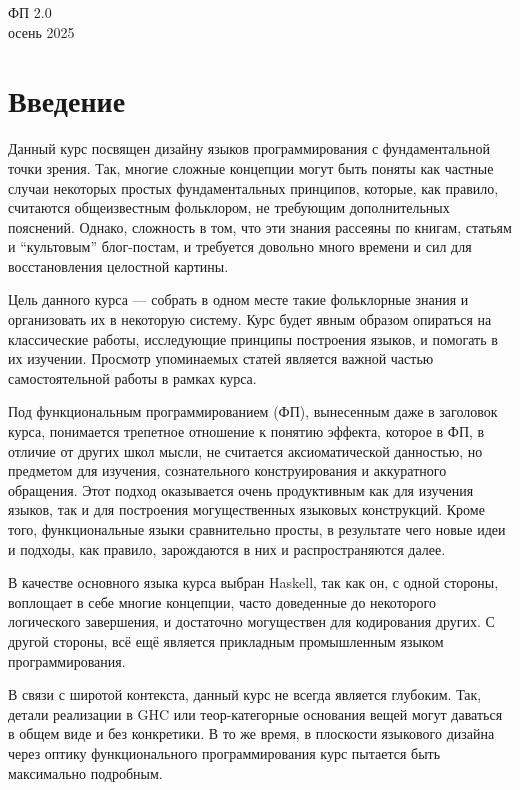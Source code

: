 \documentclass[12pt]{article}
\begin{document}
    \begin{center}
    {\LARGE ФП 2.0}
        \\
        осень 2025
    \end{center}

    \tableofcontents

    \newpage

    \section*{Введение}

    Данный курс посвящен дизайну языков программирования с фундаментальной точки зрения.
    Так, многие сложные концепции могут быть поняты как частные случаи некоторых простых фундаментальных принципов, которые, как правило, считаются общеизвестным фольклором, не требующим дополнительных пояснений.
    Однако, сложность в том, что эти знания рассеяны по книгам, статьям и ``культовым'' блог-постам, и требуется довольно много времени и сил для восстановления целостной картины.

    Цель данного курса --- собрать в одном месте такие фольклорные знания и организовать их в некоторую систему.
    Курс будет явным образом опираться на классические работы, исследующие принципы построения языков, и помогать в их изучении.
    Просмотр упоминаемых статей является важной частью самостоятельной работы в рамках курса.

    Под функциональным программированием (ФП), вынесенным даже в заголовок курса, понимается трепетное отношение к понятию эффекта, которое в ФП, в отличие от других школ мысли, не считается аксиоматической данностью, но предметом для изучения, сознательного конструирования и аккуратного обращения.
    Этот подход оказывается очень продуктивным как для изучения языков, так и для построения могущественных языковых конструкций.
    Кроме того, функциональные языки сравнительно просты, в результате чего новые идеи и подходы, как правило, зарождаются в них и распространяются далее.

    В качестве основного языка курса выбран Haskell, так как он, с одной стороны, воплощает в себе многие концепции, часто доведенные до некоторого логического завершения, и достаточно могуществен для кодирования других.
    С другой стороны, всё ещё является прикладным промышленным языком программирования.

    В связи с широтой контекста, данный курс не всегда является глубоким.
    Так, детали реализации в GHC или теор-категорные основания вещей могут даваться в общем виде и без конкретики.
    В то же время, в плоскости языкового дизайна через оптику функционального программирования курс пытается быть максимально подробным.
\end{document}
